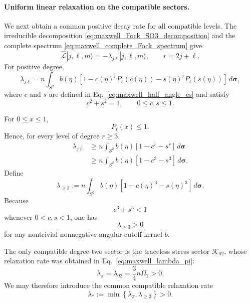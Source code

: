 \documentclass[11pt,oneside]{article}
\numberwithin{equation}{section}
\theoremstyle{definition}
\begin{document}
\paragraph{Uniform linear relaxation on the compatible sectors.}

We next obtain a common positive decay rate for all compatible levels.
The irreducible decomposition
\eqref{eq:maxwell_Fock_SO3_decomposition} and the complete spectrum
\eqref{eq:maxwell_complete_Fock_spectrum} give
\begin{equation}
\widehat{\mathcal L}
|j,\ell,m\rangle
=
-\lambda_{j\ell}|j,\ell,m\rangle,
\qquad
r=2j+\ell.
\end{equation}
For positive degree,
\begin{equation}
\lambda_{j\ell}
=
n\int_{S^2}
b(\eta)
\left[
1
-
c(\eta)^rP_\ell(c(\eta))
-
s(\eta)^rP_\ell(s(\eta))
\right]
\,d\bm\sigma,
\label{eq:maxwell_jet_spectrum_positive_degree}
\end{equation}
where $c$ and $s$ are defined in
Eq.~\eqref{eq:maxwell_half_angle_cs} and satisfy
\begin{equation}
c^2+s^2=1,
\qquad
0\leq c,s\leq1.
\end{equation}

For $0\leq x\leq1$,
\begin{equation}
P_\ell(x)\leq1.
\end{equation}
Hence, for every level of degree $r\geq3$,
\begin{align}
\lambda_{j\ell}
&\geq
n\int_{S^2}
b(\eta)
\left[
1-c^r-s^r
\right]
\,d\bm\sigma
\nonumber\\
&\geq
n\int_{S^2}
b(\eta)
\left[
1-c^3-s^3
\right]
\,d\bm\sigma .
\label{eq:maxwell_jet_gap_bound}
\end{align}
Define
\begin{equation}
\lambda_{\ge 3}
:=
n\int_{S^2}
b(\eta)
\left[
1-c(\eta)^3-s(\eta)^3
\right]
\,d\bm\sigma .
\label{eq:maxwell_jet_lambda_ng}
\end{equation}
Because
\begin{equation}
c^3+s^3<1
\end{equation}
whenever $0<c,s<1$, one has
\begin{equation}
\lambda_{\ge 3}>0
\end{equation}
for any nontrivial nonnegative angular-cutoff kernel $b$.

The only compatible degree-two sector is the traceless stress sector
$\mathscr K_{02}$, whose relaxation rate was obtained in
Eq.~\eqref{eq:maxwell_lambda_pi}:
\begin{equation}
\lambda_\pi
=
\lambda_{02}
=
\frac34n\Omega_2>0.
\end{equation}
We may therefore introduce the common compatible relaxation rate
\begin{equation}
\lambda_*
:=
\min
\left\{
\lambda_\pi,
\lambda_{\ge 3}
\right\}
>0.
\label{eq:maxwell_jet_uniform_gap}
\end{equation}
\end{document}
